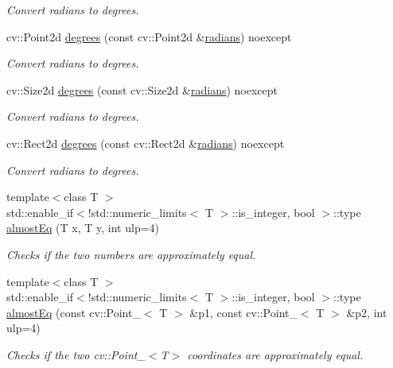 \begin{DoxyCompactItemize}
\begin{DoxyCompactList}\small\item\em Convert radians to degrees. \end{DoxyCompactList}\item 
cv\+::\+Point2d \hyperlink{group___utility_module_ga8ee006518e8f0489aa3e18166d74c6fe}{degrees} (const cv\+::\+Point2d \&\hyperlink{group___utility_module_ga547c4f80c778878854c572c297cc1983}{radians}) noexcept
\begin{DoxyCompactList}\small\item\em Convert radians to degrees. \end{DoxyCompactList}\item 
cv\+::\+Size2d \hyperlink{group___utility_module_gaa1f8aec2237eca2394ae5df2528e8eca}{degrees} (const cv\+::\+Size2d \&\hyperlink{group___utility_module_ga547c4f80c778878854c572c297cc1983}{radians}) noexcept
\begin{DoxyCompactList}\small\item\em Convert radians to degrees. \end{DoxyCompactList}\item 
cv\+::\+Rect2d \hyperlink{group___utility_module_ga1be3f98796bf80ec2aa5899e73269be7}{degrees} (const cv\+::\+Rect2d \&\hyperlink{group___utility_module_ga547c4f80c778878854c572c297cc1983}{radians}) noexcept
\begin{DoxyCompactList}\small\item\em Convert radians to degrees. \end{DoxyCompactList}\item 
{\footnotesize template$<$class T $>$ }\\std\+::enable\+\_\+if$<$!std\+::numeric\+\_\+limits$<$ T $>$\+::is\+\_\+integer, bool $>$\+::type \hyperlink{group___utility_module_gaab89548f655eaadb805d9099ea0ec616}{almost\+Eq} (T x, T y, int ulp=4)
\begin{DoxyCompactList}\small\item\em Checks if the two numbers are approximately equal. \end{DoxyCompactList}\item 
{\footnotesize template$<$class T $>$ }\\std\+::enable\+\_\+if$<$!std\+::numeric\+\_\+limits$<$ T $>$\+::is\+\_\+integer, bool $>$\+::type \hyperlink{group___utility_module_ga2096c3bec84b70855daa9399ec178fe2}{almost\+Eq} (const cv\+::\+Point\+\_\+$<$ T $>$ \&p1, const cv\+::\+Point\+\_\+$<$ T $>$ \&p2, int ulp=4)
\begin{DoxyCompactList}\small\item\em Checks if the two cv\+::\+Point\+\_\+$<$\+T$>$ coordinates are approximately equal. \end{DoxyCompactList}\item 

\end{DoxyCompactItemize}
